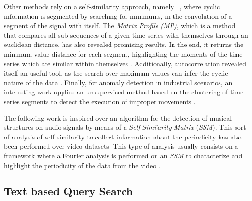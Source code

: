\par
Other methods rely on a self-similarity approach, namely ~\cite{neuza}, where cyclic information is segmented by searching for minimums, in the convolution of a segment of the signal with itself. The \textit{Matrix Profile (MP)}, which is a method that compares all sub-sequences of a given time series with themselves through an euclidean distance, has also revealed promising results. In the end, it returns the minimum value distance for each segment, highlighting the moments of the time series which are similar within themselves \cite{Yeh2018}. Additionally, autocorrelation revealed itself an useful tool, as the search over maximum values can infer the cyclic nature of the data \cite{Bauters2014}. Finally, for anomaly detection in industrial scenarios, an interesting work applies an unsupervised method based on the clustering of time series segments to detect the execution of improper movements \cite{duarte2}. 
\par
The following work is inspired over an algorithm for the detection of musical structures on audio signals \cite{Foote2000, audiolabs1, audiolabs2} by means of a \textit{Self-Similarity Matrix } (\textit{SSM}). This sort of analysis of self-similarity to collect information about the periodicity has also been performed over video datasets. This type of analysis usually consists on a framework where a Fourier analysis is performed on an \textit{SSM} to characterize and highlight the periodicity of the data from the video \cite{Cutler2002,Cutler2000,Cutler1999}.

\subsection{Text based Query Search}

